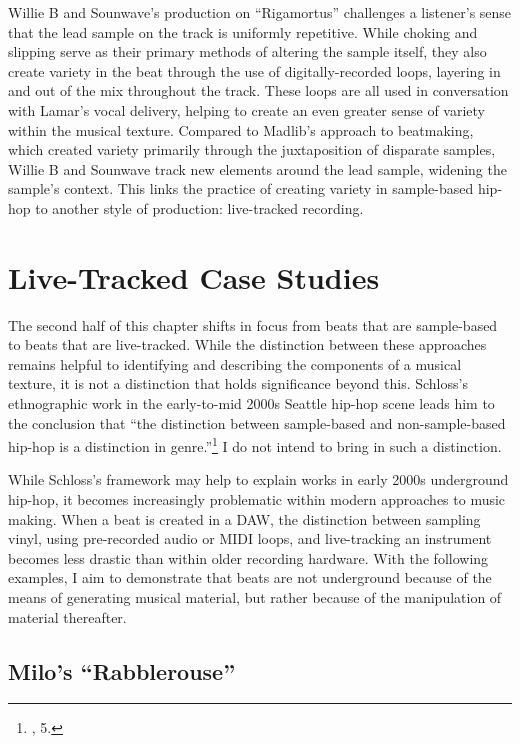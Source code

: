 Willie B and Sounwave's production on ``Rigamortus'' challenges a listener's sense that 
the lead sample on the track is uniformly repetitive. While choking and slipping serve as
their primary methods of altering the sample itself, they also create variety in the beat
through the use of digitally-recorded loops, layering in and out of the mix throughout the
track. These loops are all used in conversation with Lamar's vocal delivery, helping to 
create an even greater sense of variety within the musical texture. Compared to Madlib's 
approach to beatmaking, which created variety primarily through the juxtaposition of 
disparate samples, Willie B and Sounwave track new elements around the lead sample, 
widening the sample's context. This links the practice of creating variety in sample-based
hip-hop to another style of production: live-tracked recording.

\section{Live-Tracked Case Studies}
The second half of this chapter shifts in focus from beats that are sample-based to beats that are
live-tracked. While the distinction between these approaches remains helpful to identifying and describing
the components of a musical texture, it is not a distinction that holds significance beyond this. 
Schloss's ethnographic work in the early-to-mid 2000s Seattle hip-hop scene leads him to the conclusion
that ``the distinction between sample-based and non-sample-based hip-hop is a distinction in
genre.''\footnote{\cite{josephgschlossMakingBeatsArt2004}, 5.} I do not intend to bring in 
such a distinction.

While Schloss's framework may help to explain works in early 2000s underground hip-hop, it becomes
increasingly problematic within modern approaches to music making. When a beat is created in a DAW, 
the distinction between sampling vinyl, using pre-recorded audio or MIDI loops, and live-tracking an
instrument becomes less drastic than within older recording hardware. With the following examples, I aim
to demonstrate that beats are not underground because of the means of generating musical material, but 
rather because of the manipulation of material thereafter.

\subsection*{\centering Milo's ``Rabblerouse''}

